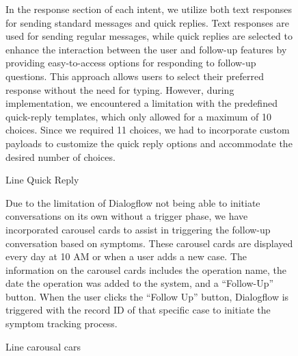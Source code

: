 \documentclass[12pt,oneside,openright,a4paper]{cpe-english-project}
\begin{document}
\begin{figure}[H]
            \caption{Line Quick Reply}\label{fig:quickreply}
            \begin{justify}
              \qquad In the response section of each intent, we utilize both text responses for sending standard messages and quick replies. Text responses are used for sending regular messages, while quick replies are selected to enhance the interaction between the user and follow-up features by providing easy-to-access options for responding to follow-up questions. This approach allows users to select their preferred response without the need for typing. However, during implementation, we encountered a limitation with the predefined quick-reply templates, which only allowed for a maximum of 10 choices. Since we required 11 choices, we had to incorporate custom payloads to customize the quick reply options and accommodate the desired number of choices.\par            \end{justify}
          \end{figure}
          \begin{figure}[H]
            \centering
            \caption{Line carousal cars}\label{fig:line-Carousel Card}
            \begin{justify}
              \qquad Due to the limitation of Dialogflow not being able to initiate conversations on its own without a trigger phase, we have incorporated carousel cards to assist in triggering the follow-up conversation based on symptoms. These carousel cards are displayed every day at 10 AM or when a user adds a new case. The information on the carousel cards includes the operation name, the date the operation was added to the system, and a “Follow-Up” button. When the user clicks the “Follow Up” button, Dialogflow is triggered with the record ID of that specific case to initiate the symptom tracking process.\par
            \end{justify}
          \end{figure}
\end{document}
